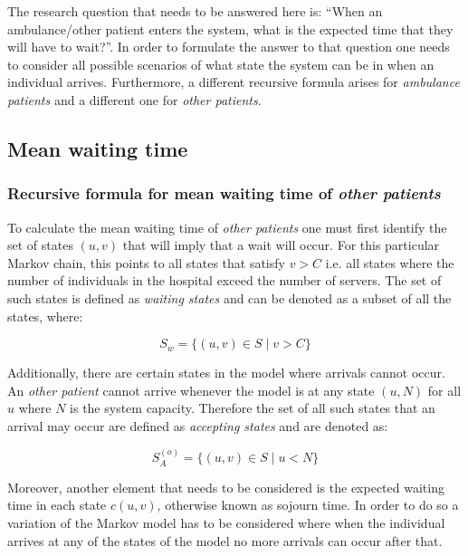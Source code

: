 The research question that needs to be answered here is: ``When an ambulance/other patient enters the system, what is the expected time that they will have to wait?''. In order to formulate the answer to that question one needs to consider all possible scenarios of what state the system can be in when an individual arrives. Furthermore, a different recursive formula arises for \textit{ambulance patients} and a different one for \textit{other patients}.

\subsection{Mean waiting time}
\subsubsection{Recursive formula for mean waiting time of \textit{other patients}}

To calculate the mean waiting time of \textit{other patients} one must first identify the set of states \((u, v)\) that will imply that a wait will occur. For this particular Markov chain, this points to all states that satisfy \(v > C\) i.e. all states where the number of individuals in the hospital exceed the number of servers. The set of such states is defined as \textit{waiting states} and can be denoted as a subset of all the states, where:

\begin{equation} \label{eq:waiting_states}
    S_w = \{(u, v) \in S \; | \; v > C \}    
\end{equation}

Additionally, there are certain states in the model where arrivals cannot occur. An \textit{other patient} cannot arrive whenever the model is at any state \((u, N)\) for all \(u\) where \(N\) is the system capacity. Therefore the set of all such states that an arrival may occur are defined as \textit{accepting states} and are denoted as:

\begin{equation}\label{accepting_states_others}
    S_A^{(o)} = \{(u, v) \in S \; | \; u < N \}
\end{equation}



Moreover, another element that needs to be considered is the expected waiting time in each state \( c(u,v) \), otherwise known as sojourn time. In order to do so a variation of the Markov model has to be considered where when the individual arrives at any of the states of the model no more arrivals can occur after that. 


